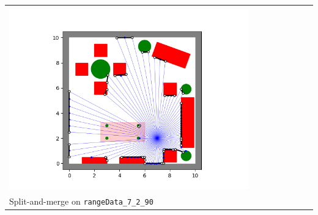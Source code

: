 \documentclass{article}
\begin{document}
\begin{enumerate}[label=(\roman*)]
\begin{tabular}[t]{l}
	\hline \\
	\includegraphics[width=0.80\textwidth]{img/rangeData_7_2_90.png} \\
	\hline
	Split-and-merge on \texttt{rangeData\_7\_2\_90} \\
\end{tabular}

\end{enumerate}
\end{document}
